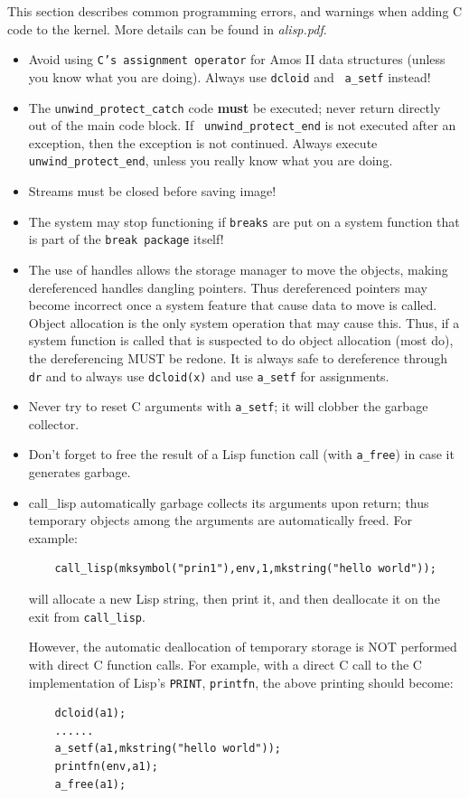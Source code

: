 This section describes common programming errors, and warnings when
adding C code to the kernel. More details can be found in {\em
alisp.pdf}.
\begin{itemize}
\item Avoid using {\tt C's assignment operator} for Amos II data structures
(unless you know what you are doing). Always use {\tt dcloid} and {\tt
a\_setf} instead!

\item The {\tt unwind\_protect\_catch} code {\bf must} be executed;
never return directly out of the main code block.  If {\tt
unwind\_protect\_end} is not executed after an exception, then the exception
is not continued.  Always execute {\tt unwind\_protect\_end}, unless you
really know what you are doing.

\item Streams must be closed before saving image!

\item The system may stop functioning if {\tt breaks} are put
on a system function that is part of the {\tt break package} itself!

\item The use of handles allows the storage manager to move the
objects, making dereferenced handles dangling pointers.  Thus dereferenced
pointers may become incorrect once a system feature that cause data to
move is called. Object allocation is the only system
operation that may cause this.  Thus, if a system function is called that
is suspected to do object allocation (most do), the 
dereferencing MUST be redone.  It is always safe to dereference through
{\tt dr} and to always use {\tt dcloid(x)} and use {\tt a\_setf} for
assignments.

\item Never try to reset C arguments with {\tt a\_setf}; it will
clobber the garbage collector.

\item Don't forget to free the result of a Lisp function call
(with {\tt a\_free}) in case it generates garbage.

\item call\_lisp automatically garbage
collects its arguments upon return; thus temporary objects among the
arguments are automatically freed. For example:

\begin{verbatim}
    call_lisp(mksymbol("prin1"),env,1,mkstring("hello world"));
\end{verbatim}
will allocate a new Lisp string, then print it, and then deallocate it
on the exit from {\tt call\_lisp}.

However, the automatic deallocation of temporary storage is NOT performed
with direct C function calls. For example, with a direct C call
to the C implementation of Lisp's {\tt PRINT}, {\tt printfn},
the above printing should become:
\begin{verbatim}
    dcloid(a1);
    ......
    a_setf(a1,mkstring("hello world"));
    printfn(env,a1);
    a_free(a1);
\end{verbatim}
\end{itemize}

